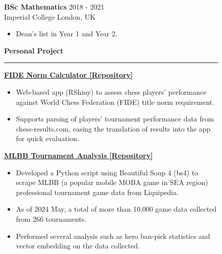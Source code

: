 \documentclass[a4paper, 10pt]{article}
\newcommand{\rhsWidth}{0.65\textwidth}
\newenvironment{expSection}[3]{%
    \textbf{#1} \hfill {#2} \\
    #3
	\vspace{-6pt}
}{}
\begin{document}
\begin{figure}[h]
\begin{minipage}[t]{\rhsWidth}
	\begin{expSection} {BSc Mathematics} {2018 - 2021} {Imperial College London, UK}
		\begin{itemize} [itemsep = 0pt, parsep=2pt]
			\item Dean's list in Year 1 and Year 2.
		\end{itemize}
	\end{expSection}
	
	\vspace{1.0em}

	{\Large \faTools \hspace{3pt} \textbf{Personal Project}} \newline
	\rule [6pt]{\linewidth}{1pt}
	\vspace{-15pt}

	\textbf{\href{https://github.com/LiTianYeoh/FIDE_Norm_Calculator}{\color{black} FIDE Norm Calculator [\faGithub \space Repository]}}
	\vspace{-6pt}
	\begin{itemize} [itemsep = 0pt, parsep=2pt]
		\item Web-based app (RShiny) to assess chess players' performance against World Chess Federation (FIDE) title norm requirement. 
		\item Supports parsing of players' tournament performance data from chess-results.com, easing the translation of results into the app for quick evaluation.
	\end{itemize}

	\textbf{\href{https://github.com/LiTianYeoh/MLBB_Tournament_Analysis}{\color{black} MLBB Tournament Analysis [\faGithub \space Repository] }}
	\vspace{-6pt}
	\begin{itemize} [itemsep = 0pt, parsep=2pt]
		\item Developed a Python script using Beautiful Soup 4 (bs4) to scrape MLBB (a popular mobile MOBA game in SEA region) professional tournament game data from Liquipedia.
		\item As of 2024 May, a total of more than 10,000 game data collected from 266 tournaments.
		\item Performed several analysis such as hero ban-pick statistics and vector embedding on the data collected.
	\end{itemize}
\end{minipage}

\end{figure}
\end{document}
